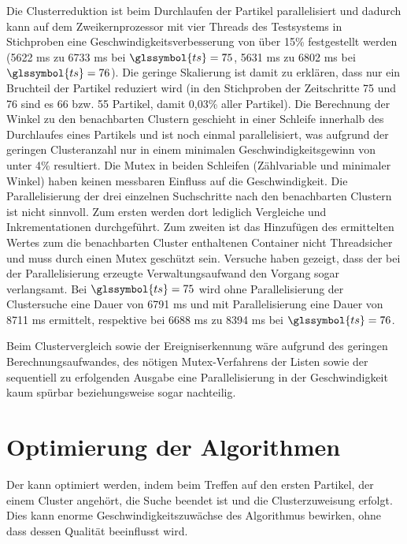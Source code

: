 Die Clusterreduktion ist beim Durchlaufen der Partikel parallelisiert und dadurch kann auf dem Zweikernprozessor mit vier Threads des Testsystems in Stichproben eine Geschwindigkeitsverbesserung von über 15\% festgestellt werden (5622 \gls{ms} zu 6733 \gls{ms} bei $\glssymbol{ts}=75$, 5631 \gls{ms} zu 6802 \gls{ms} bei $\glssymbol{ts}=76$). Die geringe Skalierung ist damit zu erklären, dass nur ein Bruchteil der Partikel reduziert wird (in den Stichproben der Zeitschritte 75 und 76 sind es 66 bzw. 55 Partikel, damit 0,03\% aller Partikel). Die Berechnung der Winkel zu den benachbarten Clustern geschieht in einer Schleife innerhalb des Durchlaufes eines Partikels und ist noch einmal parallelisiert, was aufgrund der geringen Clusteranzahl nur in einem minimalen Geschwindigkeitsgewinn von unter 4\% resultiert. Die Mutex in beiden Schleifen (Zählvariable und minimaler Winkel) haben keinen messbaren Einfluss auf die Geschwindigkeit.
Die Parallelisierung der drei einzelnen Suchschritte nach den benachbarten Clustern ist nicht sinnvoll. Zum ersten werden dort lediglich Vergleiche und Inkrementationen durchgeführt. Zum zweiten ist das Hinzufügen des ermittelten Wertes zum die benachbarten Cluster enthaltenen Container nicht Threadsicher und muss durch einen Mutex geschützt sein. Versuche haben gezeigt, dass der bei der Parallelisierung erzeugte Verwaltungsaufwand den Vorgang sogar verlangsamt. Bei $\glssymbol{ts}=75$ wird ohne Parallelisierung der Clustersuche eine Dauer von 6791 \gls{ms} und mit Parallelisierung eine Dauer von 8711 \gls{ms} ermittelt, respektive bei 6688 \gls{ms} zu 8394 \gls{ms} bei $\glssymbol{ts}=76$.

Beim Clustervergleich sowie der Ereigniserkennung wäre aufgrund des geringen Berechnungsaufwandes, des nötigen Mutex-Verfahrens der Listen sowie der sequentiell zu erfolgenden Ausgabe eine Parallelisierung in der Geschwindigkeit kaum spürbar beziehungsweise sogar nachteilig.



\section{Optimierung der Algorithmen}\label{sec:disc:optimierungAlg}
Der \CFD kann optimiert werden, indem beim Treffen auf den ersten Partikel, der einem Cluster angehört, die Suche beendet ist und die Clusterzuweisung erfolgt. Dies kann enorme Geschwindigkeitszuwächse des Algorithmus bewirken, ohne dass dessen Qualität beeinflusst wird.


